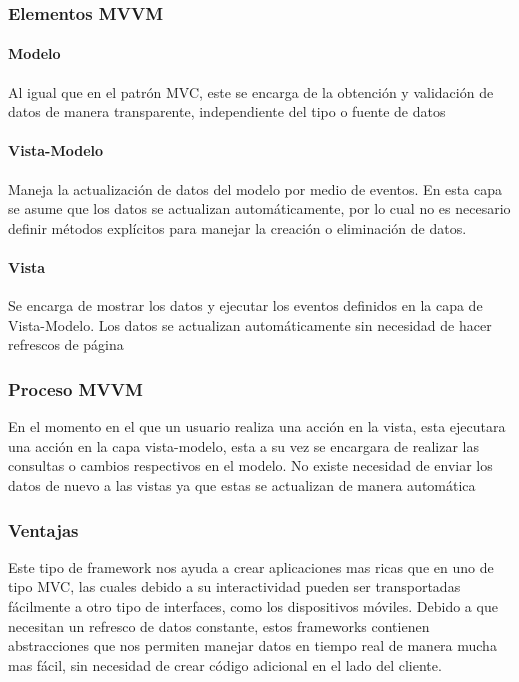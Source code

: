 \subsubsection{Elementos MVVM}

\paragraph{Modelo}
Al igual que en el patrón MVC, este se encarga de la obtención y
validación de datos de manera transparente, independiente del
tipo o fuente de datos

\paragraph{Vista-Modelo}
Maneja la actualización de datos del modelo por medio de eventos. En esta capa
se asume que los datos se actualizan automáticamente, por lo cual no es
necesario definir métodos explícitos para manejar la creación o eliminación
de datos.

\paragraph{Vista}
Se encarga de mostrar los datos y ejecutar los eventos definidos en la
capa de Vista-Modelo. Los datos se actualizan automáticamente sin necesidad
de hacer refrescos de página

\subsubsection{Proceso MVVM}
En el momento en el que un usuario realiza una acción en la vista, esta ejecutara
una acción en la capa vista-modelo, esta a su vez se encargara de realizar las
consultas o cambios respectivos en el modelo. No existe necesidad de enviar los
datos de nuevo a las vistas ya que estas se actualizan de manera automática

\subsubsection{Ventajas}
Este tipo de framework nos ayuda a crear aplicaciones mas ricas
que en uno de tipo MVC, las cuales debido a su interactividad pueden
ser transportadas fácilmente a otro tipo de interfaces, como los
dispositivos móviles.
Debido a que necesitan un refresco de datos constante, estos frameworks
contienen abstracciones que nos permiten manejar datos en tiempo real
de manera mucha mas fácil, sin necesidad de crear código adicional en
el lado del cliente.

